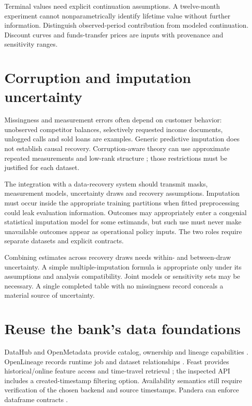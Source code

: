 Terminal values need explicit continuation assumptions. A twelve-month
experiment cannot nonparametrically identify lifetime value without further
information. Distinguish observed-period contribution from modeled
continuation. Discount curves and funds-transfer prices are inputs with
provenance and sensitivity ranges.

\section{Corruption and imputation uncertainty}
Missingness and measurement errors often depend on customer behavior:
unobserved competitor balances, selectively requested income documents,
unlogged calls and sold loans are examples. Generic predictive imputation
does not establish causal recovery. Corruption-aware theory can use
approximate repeated measurements and low-rank structure
\citep{corrupt2022}; those restrictions must be justified for each dataset.

The integration with a data-recovery system should transmit masks,
measurement models, uncertainty draws and recovery assumptions. Imputation
must occur inside the appropriate training partitions when fitted
preprocessing could leak evaluation information. Outcomes may appropriately
enter a congenial statistical imputation model for some estimands, but such
use must never make unavailable outcomes appear as operational policy inputs.
The two roles require separate datasets and explicit contracts.

Combining estimates across recovery draws needs within- and between-draw
uncertainty. A simple multiple-imputation formula is appropriate only under
its assumptions and analysis compatibility. Joint models or sensitivity sets
may be necessary. A single completed table with no missingness record
conceals a material source of uncertainty.

\section{Reuse the bank's data foundations}
DataHub and OpenMetadata provide catalog, ownership and lineage capabilities
\citep{sw_datahub,sw_openmetadata}. OpenLineage records runtime job and dataset
relationships \citep{sw_openlineage}. Feast provides historical/online feature
access and time-travel retrieval \citep{sw_feast}; the inspected API includes
a created-timestamp filtering option. Availability semantics still require
verification of the chosen backend and source timestamps.
Pandera can enforce dataframe contracts \citep{sw_pandera}.

